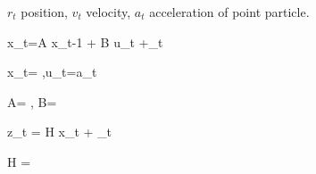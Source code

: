 $r_t$ position, $v_t$ velocity, $a_t$
acceleration of point particle.

\beq
x_t=A x_{t-1} + B u_t +\xi_t
\eeq

\beq
x_t= 
\left[
\begin{array}{c}
r_t
\\
v_t
\end{array}
\right]
\;,\quad u_t=a_t
\eeq

\beq
A=
\;,\quad
B=
\eeq

\beq
z_t = H x_t + \zeta_t
\eeq

\beq
H =
\left[
\begin{array}{cc}
1&0
\end{array}
\right]
\eeq

